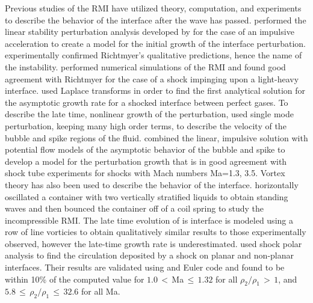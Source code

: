 \documentclass{article}
\begin{document}
Previous studies of the \ac{RMI} have utilized theory, computation,
and experiments to describe the behavior of the interface after the
wave has passed. \cite{Richtmyer1960} performed the linear stability
perturbation analysis developed by \cite{Taylor1950} for the case of
an impulsive acceleration to create a model for the initial growth of
the interface perturbation. \cite{Meshkov1969} experimentally
confirmed Richtmyer's qualitative predictions, hence the name of the
instability. \cite{Meyer1972} performed numerical simulations of the
\ac{RMI} and found good agreement with Richtmyer for the case of a
shock impinging upon a light-heavy interface. \cite{Fraley1986} used
Laplace transforms in order to find the first analytical solution for
the asymptotic growth rate for a shocked interface between perfect
gases. To describe the late time, nonlinear growth of the
perturbation, \cite{Zhang1997} used single mode perturbation, keeping
many high order terms, to describe the velocity of the bubble and
spike regions of the fluid. \cite{Sadot1998} combined the linear,
impulsive solution with potential flow models of the asymptotic
behavior of the bubble and spike to develop a model for the
perturbation growth that is in good agreement with shock tube
experiments for shocks with Mach numbers Ma=1.3, 3.5. Vortex theory
has also been used to describe the behavior of the
interface. \cite{Jacobs1996} horizontally oscillated a container with
two vertically stratified liquids to obtain standing waves and then
bounced the container off of a coil spring to study the incompressible
\ac{RMI}. The late time evolution of is interface is modeled using a
row of line vorticies to obtain qualitatively similar results to those
experimentally observed, however the late-time growth rate is
underestimated. \cite{Samtaney1994} used shock polar analysis to find
the circulation deposited by a shock on planar and non-planar
interfaces. Their results are validated using and Euler code and found
to be within 10\% of the computed value for $1.0\,<\,$Ma$\,\leq\,1.32$
for all $\rho_2/\rho_1\,>\,1$, and
$5.8\,\leq\,\rho_2/\rho_1\,\leq\,32.6$ for all Ma.
\end{document}
